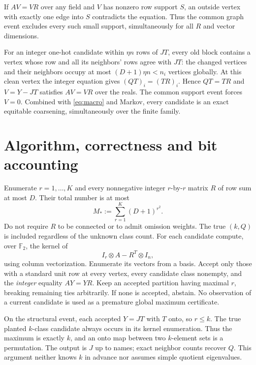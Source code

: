 \documentclass[11pt]{article}
\newcommand{\F}{\mathbb F}
\begin{document}
If $AV=VR$ over any field and $V$ has nonzero row support $S$, an
outside vertex with exactly one edge into $S$ contradicts the equation.
Thus the common graph event excludes every such small support,
simultaneously for all $R$ and vector dimensions.

For an integer one-hot candidate within $\eta n$ rows of $JT$, every
old block contains a vertex whose row and all its neighbors' rows
agree with $JT$: the changed vertices and their neighbors occupy at
most $(D+1)\eta n<n_i$ vertices globally. At this clean vertex the
integer equation gives $(QT)_i=(TR)_i$. Hence $QT=TR$ and
$V=Y-JT$ satisfies $AV=VR$ over the reals. The common support event
forces $V=0$. Combined with \eqref{eq:macro} and Markov, every
candidate is an exact equitable coarsening, simultaneously over the
finite family.

\section{Algorithm, correctness and bit accounting}
Enumerate $r=1,\ldots,K$ and every nonnegative integer $r$-by-$r$
matrix $R$ of row sum at most $D$. Their total number is at most
\[
 M_*:=\sum_{r=1}^K(D+1)^{r^2}.
\]
Do not require $R$ to be connected or to admit omission weights.
The true $(k,Q)$ is included regardless of the unknown class count.
For each candidate compute, over $\F_2$, the kernel of
\[
 I_r\otimes A-R^T\otimes I_n,
\]
using column vectorization. Enumerate its vectors from a basis. Accept
only those with a standard unit row at every vertex, every candidate
class nonempty, and the \emph{integer} equality $AY=YR$. Keep an
accepted partition having maximal $r$, breaking remaining ties
arbitrarily. If none is accepted, abstain. No observation of a current
candidate is used as a premature global maximum certificate.

On the structural event, each accepted $Y=JT$ with $T$ onto, so
$r\le k$. The true planted $k$-class candidate always occurs in its
kernel enumeration. Thus the maximum is exactly $k$, and an onto map
between two $k$-element sets is a permutation. The output is $J$ up to
names; exact neighbor counts recover $Q$. This argument neither knows
$k$ in advance nor assumes simple quotient eigenvalues.
\end{document}
